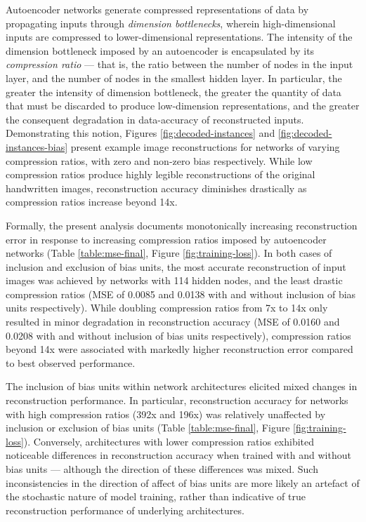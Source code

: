 
Autoencoder networks generate compressed representations of data by propagating inputs through \textit{dimension bottlenecks}, wherein high-dimensional inputs are compressed to lower-dimensional representations.
The intensity of the dimension bottleneck imposed by an autoencoder is encapsulated by its \textit{compression ratio} --- that is, the ratio between the number of nodes in the input layer, and the number of nodes in the smallest hidden layer.
In particular, the greater the intensity of dimension bottleneck, the greater the quantity of data that must be discarded to produce low-dimension representations, and the greater the consequent degradation in data-accuracy of reconstructed inputs.
Demonstrating this notion, Figures \ref{fig:decoded-instances} and \ref{fig:decoded-instances-bias} present example image reconstructions for networks of varying compression ratios, with zero and non-zero bias respectively.
While low compression ratios produce highly legible reconstructions of the original handwritten images, reconstruction accuracy diminishes drastically as compression ratios increase beyond 14x.

Formally, the present analysis documents monotonically increasing reconstruction error in response to increasing compression ratios imposed by autoencoder networks (Table \ref{table:mse-final}, Figure \ref{fig:training-loss}).
In both cases of inclusion and exclusion of bias units, the most accurate reconstruction of input images was achieved by networks with  114 hidden nodes, and the least drastic compression ratios (MSE of 0.0085 and 0.0138 with and without inclusion of bias units respectively). 
While doubling compression ratios from 7x to 14x only resulted in minor degradation in reconstruction accuracy (MSE of 0.0160 and 0.0208 with and without inclusion of bias units respectively), compression ratios beyond 14x were associated with markedly higher reconstruction error compared to best observed performance.

The inclusion of bias units within network architectures elicited mixed changes in reconstruction performance.
In particular, reconstruction accuracy for networks with high compression ratios (392x and 196x) was relatively unaffected by  inclusion or exclusion of bias units (Table \ref{table:mse-final}, Figure \ref{fig:training-loss}).
Conversely, architectures with lower compression ratios exhibited noticeable differences in reconstruction accuracy when trained with and without bias units --- although the direction of these differences was mixed.
Such inconsistencies in the direction of affect of bias units are more likely an artefact of the stochastic nature of model training, rather than indicative of true reconstruction performance of underlying architectures.

